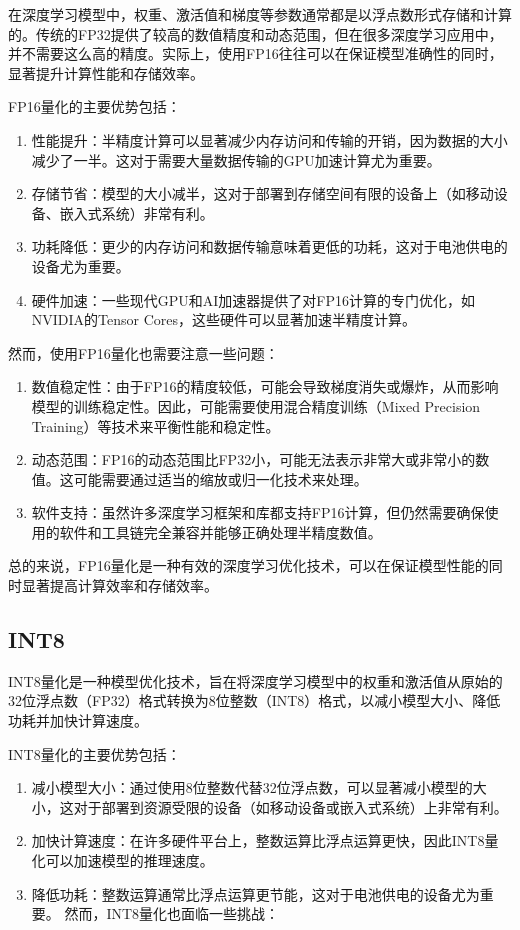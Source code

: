 在深度学习模型中，权重、激活值和梯度等参数通常都是以浮点数形式存储和计算的。传统的FP32提供了较高的数值精度和动态范围，但在很多深度学习应用中，并不需要这么高的精度。实际上，使用FP16往往可以在保证模型准确性的同时，显著提升计算性能和存储效率。

FP16量化的主要优势包括：

\begin{enumerate}
	\item 性能提升：半精度计算可以显著减少内存访问和传输的开销，因为数据的大小减少了一半。这对于需要大量数据传输的GPU加速计算尤为重要。
	\item 存储节省：模型的大小减半，这对于部署到存储空间有限的设备上（如移动设备、嵌入式系统）非常有利。
	\item 功耗降低：更少的内存访问和数据传输意味着更低的功耗，这对于电池供电的设备尤为重要。
	\item 硬件加速：一些现代GPU和AI加速器提供了对FP16计算的专门优化，如NVIDIA的Tensor Cores，这些硬件可以显著加速半精度计算。
\end{enumerate}

然而，使用FP16量化也需要注意一些问题：

\begin{enumerate}
	\item 数值稳定性：由于FP16的精度较低，可能会导致梯度消失或爆炸，从而影响模型的训练稳定性。因此，可能需要使用混合精度训练（Mixed Precision Training）等技术来平衡性能和稳定性。
	\item 动态范围：FP16的动态范围比FP32小，可能无法表示非常大或非常小的数值。这可能需要通过适当的缩放或归一化技术来处理。
	\item 软件支持：虽然许多深度学习框架和库都支持FP16计算，但仍然需要确保使用的软件和工具链完全兼容并能够正确处理半精度数值。
\end{enumerate}

总的来说，FP16量化是一种有效的深度学习优化技术，可以在保证模型性能的同时显著提高计算效率和存储效率。

\subsection{INT8}

INT8量化是一种模型优化技术，旨在将深度学习模型中的权重和激活值从原始的32位浮点数（FP32）格式转换为8位整数（INT8）格式，以减小模型大小、降低功耗并加快计算速度。

INT8量化的主要优势包括：
\begin{enumerate}
	\item 减小模型大小：通过使用8位整数代替32位浮点数，可以显著减小模型的大小，这对于部署到资源受限的设备（如移动设备或嵌入式系统）上非常有利。
	\item 加快计算速度：在许多硬件平台上，整数运算比浮点运算更快，因此INT8量化可以加速模型的推理速度。
	\item 降低功耗：整数运算通常比浮点运算更节能，这对于电池供电的设备尤为重要。
	然而，INT8量化也面临一些挑战：
\end{enumerate}

